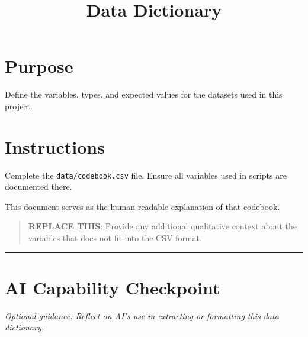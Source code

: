 \documentclass[
]{report}
\title{Data Dictionary}
\author{}
\date{}
\renewcommand*\contentsname{Table of contents}
\newcommand\contentsname{Table of contents}
\begin{document}
\maketitle

\renewcommand*\contentsname{Table of contents}
{
\hypersetup{linkcolor=}
\setcounter{tocdepth}{2}
\tableofcontents
}

\chapter{Purpose}\label{purpose}

Define the variables, types, and expected values for the datasets used
in this project.

\chapter{Instructions}\label{instructions}

Complete the \texttt{data/codebook.csv} file. Ensure all variables used
in scripts are documented there.

This document serves as the human-readable explanation of that codebook.

\begin{quote}
\textbf{REPLACE THIS}: Provide any additional qualitative context about
the variables that does not fit into the CSV format.
\end{quote}

\begin{center}\rule{0.5\linewidth}{0.5pt}\end{center}

\chapter{AI Capability Checkpoint}\label{ai-capability-checkpoint}

\emph{Optional guidance: Reflect on AI's use in extracting or formatting
this data dictionary.}
\end{document}

